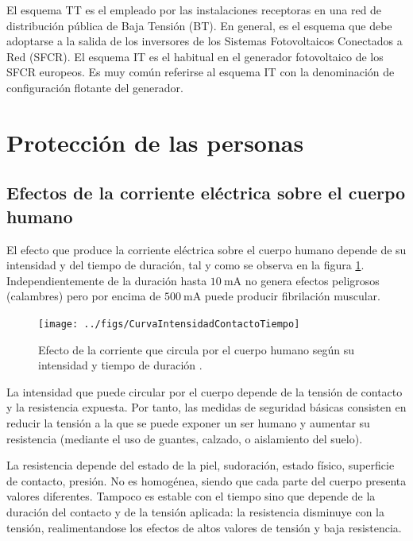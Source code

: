 El esquema TT es el empleado por las instalaciones receptoras en una
red de distribución pública de Baja Tensión (BT). En general, es el
esquema que debe adoptarse a la salida de los inversores de los Sistemas
Fotovoltaicos Conectados a Red (SFCR). El esquema IT es el habitual
en el generador fotovoltaico de los SFCR europeos. Es muy común referirse
al esquema IT con la denominación de configuración flotante del generador.


\section{Protección de las personas}


\subsection{Efectos de la corriente eléctrica sobre el cuerpo humano}

El efecto que produce la corriente eléctrica sobre el cuerpo humano
depende de su intensidad y del tiempo de duración, tal y como se observa
en la figura \ref{fig:EfectoCorriente}. Independientemente de la
duración hasta $\SI{10}{\milli\ampere}$ no genera efectos peligrosos
(calambres) pero por encima de $\SI{500}{\milli\ampere}$ puede producir
fibrilación muscular.

%
\begin{figure}
\texttt{[image: ../figs/CurvaIntensidadContactoTiempo]}

\caption[Efecto de la corriente que circula por el cuerpo humano]{Efecto de la corriente que circula por el cuerpo humano según su
intensidad y tiempo de duración \cite{PerezGabarda2000,PerezGabarda2000a}.\label{fig:EfectoCorriente}}

\end{figure}


La intensidad que puede circular por el cuerpo depende de la tensión
de contacto y la resistencia expuesta. Por tanto, las medidas de seguridad
básicas consisten en reducir la tensión a la que se puede exponer
un ser humano y aumentar su resistencia (mediante el uso de guantes,
calzado, o aislamiento del suelo). 

La resistencia depende del estado de la piel, sudoración, estado físico,
superficie de contacto, presión. No es homogénea, siendo que cada
parte del cuerpo presenta valores diferentes. Tampoco es estable con
el tiempo sino que depende de la duración del contacto y de la tensión
aplicada: la resistencia disminuye con la tensión, realimentandose
los efectos de altos valores de tensión y baja resistencia. 

